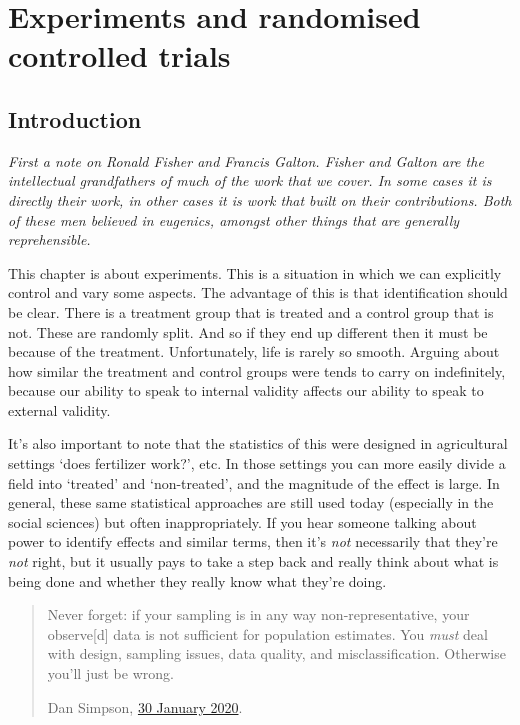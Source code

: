 \documentclass[
]{book}
\begin{document}
\hypertarget{experiments-and-randomised-controlled-trials}{%
\section{Experiments and randomised controlled trials}\label{experiments-and-randomised-controlled-trials}}

\hypertarget{introduction-14}{%
\subsection{Introduction}\label{introduction-14}}

\emph{First a note on Ronald Fisher and Francis Galton. Fisher and Galton are the intellectual grandfathers of much of the work that we cover. In some cases it is directly their work, in other cases it is work that built on their contributions. Both of these men believed in eugenics, amongst other things that are generally reprehensible.}

This chapter is about experiments. This is a situation in which we can explicitly control and vary some aspects. The advantage of this is that identification should be clear. There is a treatment group that is treated and a control group that is not. These are randomly split. And so if they end up different then it must be because of the treatment. Unfortunately, life is rarely so smooth. Arguing about how similar the treatment and control groups were tends to carry on indefinitely, because our ability to speak to internal validity affects our ability to speak to external validity.

It's also important to note that the statistics of this were designed in agricultural settings `does fertilizer work?', etc. In those settings you can more easily divide a field into `treated' and `non-treated', and the magnitude of the effect is large. In general, these same statistical approaches are still used today (especially in the social sciences) but often inappropriately. If you hear someone talking about power to identify effects and similar terms, then it's \emph{not} necessarily that they're \emph{not} right, but it usually pays to take a step back and really think about what is being done and whether they really know what they're doing.

\begin{quote}
Never forget: if your sampling is in any way non-representative, your observe{[}d{]} data is not sufficient for population estimates. You \emph{must} deal with design, sampling issues, data quality, and misclassification. Otherwise you'll just be wrong.

Dan Simpson, \href{https://twitter.com/dan_p_simpson/status/1222924987667046400}{30 January 2020}.
\end{quote}
\end{document}
